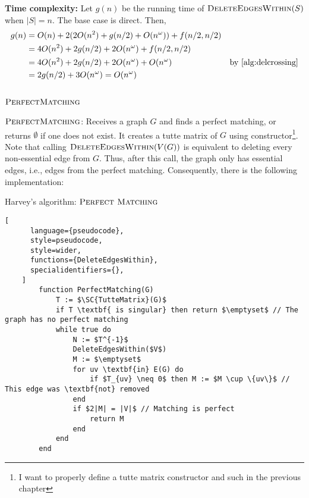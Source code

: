 \textbf{Time complexity:} Let \(g(n)\) be the running time of \(\textsc{DeleteEdgesWithin}(S)\) when \(|S| = n\).
The base case is direct.
Then, 
\begin{align}
    g(n) &= O(n) + 2 (2O(n^2) + g(n / 2) + O(n^\omega)) + f(n / 2, n / 2) &  \\
    &= 4O(n^2) + 2g(n / 2) + 2O(n^\omega) + f(n / 2, n / 2) & \\ 
    &= 4O(n^2) + 2g(n / 2) + 2O(n^\omega) + O(n^\omega) & \text{by \ref{alg:delcrossing}} \\ 
    &= 2g(n / 2) + 3O(n^\omega) = O(n^\omega) & \label{alg:delwithin}
\end{align}

\subsection{\(\SC{PerfectMatching}\)}

\(\SC{PerfectMatching}\): Receives a graph \(G\) and finds a perfect matching, or returns \(\emptyset\) if one does not exist.
It creates a tutte matrix of \(G\) using constructor\footnote{I want to properly define a tutte matrix constructor and such in the previous chapter}.
Note that calling \(\textsc{DeleteEdgesWithin}(V(G))\) is equivalent to deleting every non-essential edge from \(G\).
Thus, after this call, the graph only has essential edges, i.e., edges from the perfect matching. 
Consequently, there is the following implementation:

\begin{programruledcaption}{Harvey's algorithm: \(\SC{Perfect Matching}\)}
    \begin{lstlisting}[
      language={pseudocode},
      style=pseudocode,
      style=wider,
      functions={DeleteEdgesWithin},
      specialidentifiers={},
    ]
        function PerfectMatching(G)
            T := $\SC{TutteMatrix}(G)$
            if T \textbf{ is singular} then return $\emptyset$ // The graph has no perfect matching
            while true do
                N := $T^{-1}$
                DeleteEdgesWithin($V$)
                M := $\emptyset$
                for uv \textbf{in} E(G) do
                    if $T_{uv} \neq 0$ then M := $M \cup \{uv\}$ // This edge was \textbf{not} removed
                end
                if $2|M| = |V|$ // Matching is perfect
                    return M
                end
            end
        end
    \end{lstlisting}
\end{programruledcaption}

